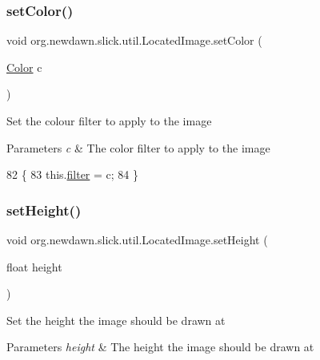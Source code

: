\subsubsection{\texorpdfstring{set\+Color()}{setColor()}}
{\footnotesize\ttfamily void org.\+newdawn.\+slick.\+util.\+Located\+Image.\+set\+Color (\begin{DoxyParamCaption}\item[{\mbox{\hyperlink{classorg_1_1newdawn_1_1slick_1_1_color}{Color}}}]{c }\end{DoxyParamCaption})\hspace{0.3cm}{\ttfamily [inline]}}

Set the colour filter to apply to the image


\begin{DoxyParams}{Parameters}
{\em c} & The color filter to apply to the image \\
\hline
\end{DoxyParams}

\begin{DoxyCode}
82                                   \{
83         this.\mbox{\hyperlink{classorg_1_1newdawn_1_1slick_1_1util_1_1_located_image_a7da79f9d1623c00f82e1a5869d69a970}{filter}} = c;
84     \}
\end{DoxyCode}
\mbox{\label{classorg_1_1newdawn_1_1slick_1_1util_1_1_located_image_a7901ef9c83e4f9f8af194267d3be8f12}} 
\subsubsection{\texorpdfstring{set\+Height()}{setHeight()}}
{\footnotesize\ttfamily void org.\+newdawn.\+slick.\+util.\+Located\+Image.\+set\+Height (\begin{DoxyParamCaption}\item[{float}]{height }\end{DoxyParamCaption})\hspace{0.3cm}{\ttfamily [inline]}}

Set the height the image should be drawn at


\begin{DoxyParams}{Parameters}
{\em height} & The height the image should be drawn at \\
\hline
\end{DoxyParams}

